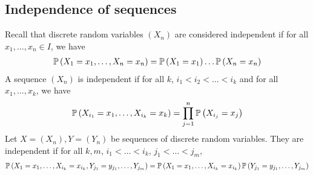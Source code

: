 \subsection{Independence of sequences}
Recall that discrete random variables $(X_n)$ are considered independent if for all $x_1, \dots, x_n \in I$, we have
\begin{align*}
	\mathbb{P}\left({X_1 = x_1, \dots, X_n = x_n}\right) = \mathbb{P}\left({X_1 = x_1}\right)\dots\mathbb{P}\left({X_n = x_n}\right)
\end{align*}
A sequence $(X_n)$ is independent if for all $k$, $i_1 < i_2 < \dots < i_k$ and for all $x_1, \dots, x_k$, we have
\begin{align*}
	\mathbb{P}\left({X_{i_1} = x_1, \dots, X_{i_k} = x_k}\right) = \prod_{j=1}^n \mathbb{P}\left({X_{i_j} = x_j}\right)
\end{align*}
Let $X = (X_n), Y = (Y_n)$ be sequences of discrete random variables.
They are independent if for all \(k,m\), $i_1 < \dots < i_k$, $j_1 < \dots < j_m$,
\begin{align*}
	\mathbb{P}\left({X_1 = x_1, \dots, X_{i_k} = x_{i_k}, Y_{j_1} = y_{j_1}, \dots, Y_{j_m}}\right) = \mathbb{P}\left({X_1 = x_1, \dots, X_{i_k} = x_{i_k}}\right) \mathbb{P}\left({Y_{j_1} = y_{j_1}, \dots, Y_{j_m}}\right)
\end{align*}

